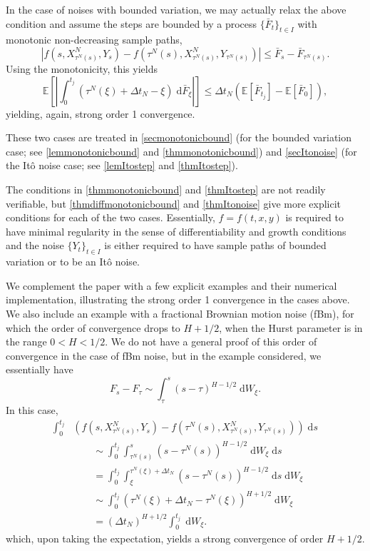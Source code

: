 \documentclass[reqno,12pt]{amsart}
\theoremstyle{plain}%
\theoremstyle{definition}
\begin{document}
In the case of noises with bounded variation, we may actually relax the above condition and assume the steps are bounded by a process $\{\bar F_t\}_{t\in I}$ with monotonic non-decreasing sample paths,
\[
    |f(s, X_{\tau^N(s)}^N, Y_s) - f(\tau^N(s), X_{\tau^N(s)}^N, Y_{\tau^N(s)})| \leq \bar F_s - \bar F_{\tau^N(s)}.
\]
Using the monotonicity, this yields
\[
    \mathbb{E}\left[\left| \int_0^{t_j} (\tau^N(\xi) + \Delta t_N - \xi) \;\mathrm{d} \bar F_\xi \right|\right] \leq \Delta t_N \left(\mathbb{E}[\bar F_{t_j}] - \mathbb{E}[\bar F_0]\right),
\]
yielding, again, strong order 1 convergence.

These two cases are treated in \cref{secmonotonicbound} (for the bounded variation case; see \cref{lemmonotonicbound} and \cref{thmmonotonicbound}) and \cref{secItonoise} (for the It\^o noise case; see \cref{lemItostep} and \cref{thmItostep}).

The conditions in \cref{thmmonotonicbound} and \cref{thmItostep} are not readily verifiable, but \cref{thmdiffmonotonicbound} and \cref{thmItonoise} give more explicit conditions for each of the two cases. Essentially, $f=f(t, x, y)$ is required to have minimal regularity in the sense of differentiability and growth conditions and the noise $\{Y_t\}_{t\in I}$ is either required to have sample paths of bounded variation or to be an It\^o noise.

We complement the paper with a few explicit examples and their numerical implementation, illustrating the strong order 1 convergence in the cases above. We also include an example with a fractional Brownian motion noise (fBm), for which the order of convergence drops to $H + 1/2$, when the Hurst parameter is in the range $0 < H < 1/2$. We do not have a general proof of this order of convergence in the case of fBm noise, but in the example considered, we essentially have
\[
    F_s - F_\tau \sim \int_\tau^s (s-\tau)^{H-1/2}\;\mathrm{d}W_\xi.
\]
In this case,
\begin{align*}
    \int_0^{t_j} & \left( f(s, X_{\tau^N(s)}^N, Y_s) - f(\tau^N(s), X_{\tau^N(s)}^N, Y_{\tau^N(s)}) \right)\;\mathrm{d}s \\ 
    & \qquad \sim \int_0^{t_j} \int_{\tau^N(s)}^s (s-\tau^N(s))^{H-1/2} \;\mathrm{d} W_\xi\;\mathrm{d}s \\
    & \qquad = \int_0^{t_j} \int_{\xi}^{\tau^N(\xi) + \Delta t_N} (s-\tau^N(s))^{H-1/2} \;\mathrm{d}s \;\mathrm{d} W_\xi \\
    & \qquad \sim \int_0^{t_j} (\tau^N(\xi) + \Delta t_N - \tau^N(\xi))^{H+1/2} \;\mathrm{d} W_\xi \\
    & \qquad = (\Delta t_N)^{H+1/2} \int_0^{t_j} \;\mathrm{d} W_\xi.
\end{align*}
which, upon taking the expectation, yields a strong convergence of order $H + 1/2$.
\end{document}
